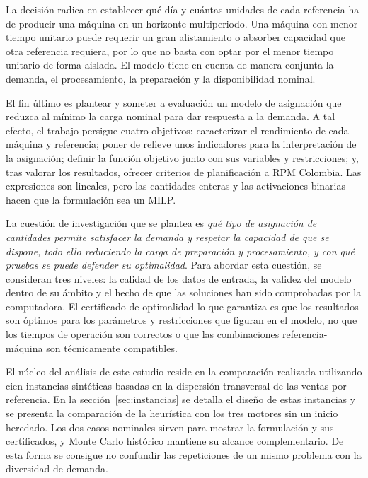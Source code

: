 \documentclass[12pt,a4paper,oneside]{article}
\begin{document}
La decisión radica en establecer qué día y cuántas unidades de cada referencia ha de producir una máquina en un horizonte multiperiodo. Una máquina con menor tiempo unitario puede requerir un gran alistamiento o absorber capacidad que otra referencia requiera, por lo que no basta con optar por el menor tiempo unitario de forma aislada. El modelo tiene en cuenta de manera conjunta la demanda, el procesamiento, la preparación y la disponibilidad nominal.

El fin último es plantear y someter a evaluación un modelo de asignación que reduzca al mínimo la carga nominal para dar respuesta a la demanda. A tal efecto, el trabajo persigue cuatro objetivos: caracterizar el rendimiento de cada máquina y referencia; poner de relieve unos indicadores para la interpretación de la asignación; definir la función objetivo junto con sus variables y restricciones; y, tras valorar los resultados, ofrecer criterios de planificación a RPM Colombia. Las expresiones son lineales, pero las cantidades enteras y las activaciones binarias hacen que la formulación sea un MILP.

La cuestión de investigación que se plantea es \textit{qué tipo de asignación de cantidades permite satisfacer la demanda y respetar la capacidad de que se dispone, todo ello reduciendo la carga de preparación y procesamiento, y con qué pruebas se puede defender su optimalidad}. Para abordar esta cuestión, se consideran tres niveles: la calidad de los datos de entrada, la validez del modelo dentro de su ámbito y el hecho de que las soluciones han sido comprobadas por la computadora. El certificado de optimalidad lo que garantiza es que los resultados son óptimos para los parámetros y restricciones que figuran en el modelo, no que los tiempos de operación son correctos o que las combinaciones referencia-máquina son técnicamente compatibles.

El núcleo del análisis de este estudio reside en la comparación realizada utilizando cien instancias sintéticas basadas en la dispersión transversal de las ventas por referencia. En la sección~\ref{sec:instancias} se detalla el diseño de estas instancias y se presenta la comparación de la heurística con los tres motores sin un inicio heredado. Los dos casos nominales sirven para mostrar la formulación y sus certificados, y Monte Carlo histórico mantiene su alcance complementario. De esta forma se consigue no confundir las repeticiones de un mismo problema con la diversidad de demanda.
\end{document}
